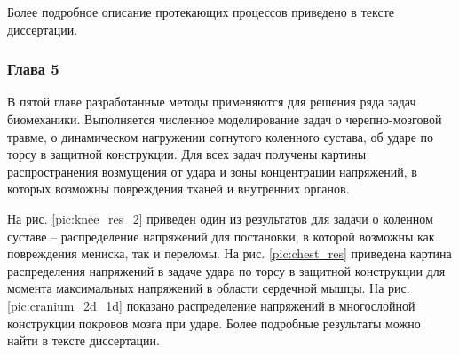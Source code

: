 Более подробное описание протекающих процессов приведено в тексте диссертации.

\clearpage
\newpage

\subsubsection*{Глава 5}

В пятой главе разработанные методы применяются для решения ряда задач биомеханики. Выполняется численное моделирование задач о черепно-мозговой травме, о динамическом нагружении согнутого коленного сустава, об ударе по торсу в защитной конструкции. Для всех задач получены картины распространения возмущения от удара и зоны концентрации напряжений, в которых возможны повреждения тканей и внутренних органов.

На рис. \ref{pic:knee_res_2} приведен один из результатов для задачи о коленном суставе -- распределение напряжений для постановки, в которой возможны как повреждения мениска, так и переломы. На рис. \ref{pic:chest_res} приведена картина распределения напряжений в задаче удара по торсу в защитной конструкции для момента максимальных напряжений в области сердечной мышцы. На рис. \ref{pic:cranium_2d_1d} показано распределение напряжений в многослойной конструкции покровов мозга при ударе. Более подробные результаты можно найти в тексте диссертации.

